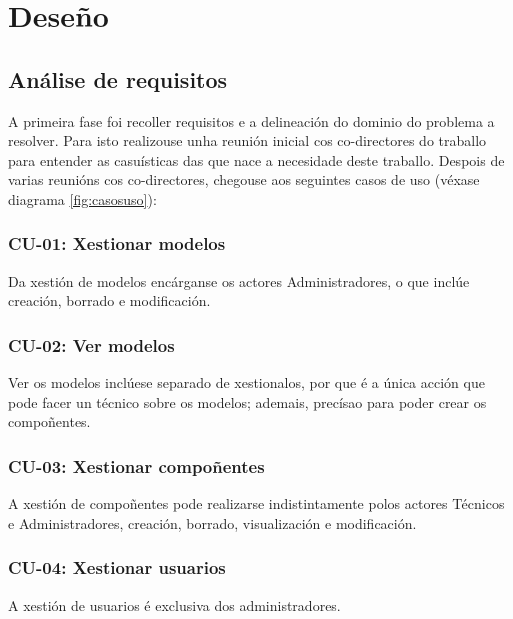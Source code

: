 \chapter{Deseño}
\label{chap:deseno}

\section{Análise de requisitos}

A primeira fase foi recoller requisitos e a delineación do dominio do problema a resolver. Para isto realizouse unha reunión inicial cos co-directores do traballo para entender as casuísticas das que nace a necesidade deste traballo. Despois de varias reunións cos co-directores, chegouse aos seguintes casos de uso (véxase diagrama \ref{fig:casosuso}):

\subsection{CU-01: Xestionar modelos}

Da xestión de modelos encárganse os actores Administradores, o que inclúe creación, borrado e modificación.

\subsection{CU-02: Ver modelos}

Ver os modelos inclúese separado de xestionalos, por que é a única acción que pode facer un técnico sobre os modelos; ademais, precísao para poder crear os compoñentes.

\subsection{CU-03: Xestionar compoñentes}

A xestión de compoñentes pode realizarse indistintamente polos actores Técnicos e Administradores, creación, borrado, visualización e modificación.

\subsection{CU-04: Xestionar usuarios}

A xestión de usuarios é exclusiva dos administradores.


